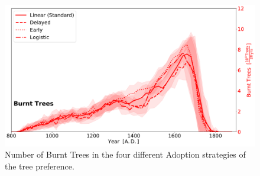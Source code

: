\begin{figure}[h]
	\centering
	\includegraphics[width=1.0\linewidth]{images/Results/TPref/TPrefAdaption_BurntTrees}
	\caption{Number of Burnt Trees in the four different Adoption strategies of the tree preference.}
	\label{fig:tprefadaptionburnttrees}
\end{figure}